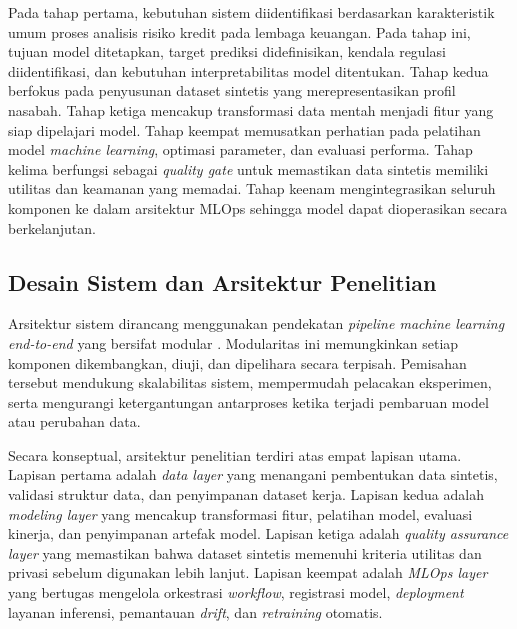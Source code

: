 Pada tahap pertama, kebutuhan sistem diidentifikasi berdasarkan karakteristik umum proses analisis risiko kredit pada lembaga keuangan. Pada tahap ini, tujuan model ditetapkan, target prediksi didefinisikan, kendala regulasi diidentifikasi, dan kebutuhan interpretabilitas model ditentukan. Tahap kedua berfokus pada penyusunan dataset sintetis yang merepresentasikan profil nasabah. Tahap ketiga mencakup transformasi data mentah menjadi fitur yang siap dipelajari model. Tahap keempat memusatkan perhatian pada pelatihan model \textit{machine learning}, optimasi parameter, dan evaluasi performa. Tahap kelima berfungsi sebagai \textit{quality gate} untuk memastikan data sintetis memiliki utilitas dan keamanan yang memadai. Tahap keenam mengintegrasikan seluruh komponen ke dalam arsitektur MLOps sehingga model dapat dioperasikan secara berkelanjutan.

\subsection{Desain Sistem dan Arsitektur Penelitian}
Arsitektur sistem dirancang menggunakan pendekatan \textit{pipeline machine learning end-to-end} yang bersifat modular \cite{google2024mlops}. Modularitas ini memungkinkan setiap komponen dikembangkan, diuji, dan dipelihara secara terpisah. Pemisahan tersebut mendukung skalabilitas sistem, mempermudah pelacakan eksperimen, serta mengurangi ketergantungan antarproses ketika terjadi pembaruan model atau perubahan data.

Secara konseptual, arsitektur penelitian terdiri atas empat lapisan utama. Lapisan pertama adalah \textit{data layer} yang menangani pembentukan data sintetis, validasi struktur data, dan penyimpanan dataset kerja. Lapisan kedua adalah \textit{modeling layer} yang mencakup transformasi fitur, pelatihan model, evaluasi kinerja, dan penyimpanan artefak model. Lapisan ketiga adalah \textit{quality assurance layer} yang memastikan bahwa dataset sintetis memenuhi kriteria utilitas dan privasi sebelum digunakan lebih lanjut. Lapisan keempat adalah \textit{MLOps layer} yang bertugas mengelola orkestrasi \textit{workflow}, registrasi model, \textit{deployment} layanan inferensi, pemantauan \textit{drift}, dan \textit{retraining} otomatis.

